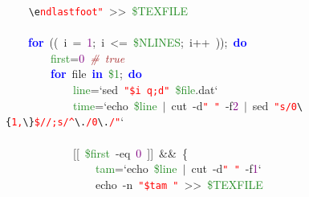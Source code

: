 \mbox{}\texttt{\textcolor{Red}{\ \ \ \ }}\texttt{\textcolor{CarnationPink}{\textbackslash{}e}}\texttt{\textcolor{Red}{ndlastfoot"{}}}\ \textcolor{BrickRed}{\textgreater{}\textgreater{}}\ \textcolor{ForestGreen}{\$TEXFILE} \\
\mbox{} \\
\mbox{}\ \ \ \ \textbf{\textcolor{Blue}{for}}\ \textcolor{BrickRed}{((}\ i\ \textcolor{BrickRed}{=}\ \textcolor{Purple}{1}\textcolor{BrickRed}{;}\ i\ \textcolor{BrickRed}{\textless{}=}\ \textcolor{ForestGreen}{\$NLINES}\textcolor{BrickRed}{;}\ i\textcolor{BrickRed}{++}\ \textcolor{BrickRed}{));}\ \textbf{\textcolor{Blue}{do}} \\
\mbox{}\ \ \ \ \ \ \ \ \textcolor{ForestGreen}{first}\textcolor{BrickRed}{=}\textcolor{Purple}{0}\ \textit{\textcolor{Brown}{\#\ true}} \\
\mbox{}\ \ \ \ \ \ \ \ \textbf{\textcolor{Blue}{for}}\ file\ \textbf{\textcolor{Blue}{in}}\ \textcolor{ForestGreen}{\$1}\textcolor{BrickRed}{;}\ \textbf{\textcolor{Blue}{do}} \\
\mbox{}\ \ \ \ \ \ \ \ \ \ \ \ \textcolor{ForestGreen}{line}\textcolor{BrickRed}{=}`sed\ \texttt{\textcolor{Red}{"{}\$i\ q;d"{}}}\ \textcolor{ForestGreen}{\$file}\textcolor{BrickRed}{.}dat` \\
\mbox{}\ \ \ \ \ \ \ \ \ \ \ \ \textcolor{ForestGreen}{time}\textcolor{BrickRed}{=}`echo\ \textcolor{ForestGreen}{\$line}\ \textcolor{BrickRed}{$|$}\ cut\ -d\texttt{\textcolor{Red}{"{}\ "{}}}\ -f\textcolor{Purple}{2}\ \textcolor{BrickRed}{$|$}\ sed\ \texttt{\textcolor{Red}{"{}s/0}}\texttt{\textcolor{CarnationPink}{\textbackslash{}\{}}\texttt{\textcolor{Red}{1,}}\texttt{\textcolor{CarnationPink}{\textbackslash{}\}}}\texttt{\textcolor{Red}{\$//;s/\textasciicircum{}}}\texttt{\textcolor{CarnationPink}{\textbackslash{}.}}\texttt{\textcolor{Red}{/0}}\texttt{\textcolor{CarnationPink}{\textbackslash{}.}}\texttt{\textcolor{Red}{/"{}}}` \\
\mbox{}\ \ \ \ \ \ \ \ \ \ \ \  \\
\mbox{}\ \ \ \ \ \ \ \ \ \ \ \ \textcolor{BrickRed}{[[}\ \textcolor{ForestGreen}{\$first}\ -eq\ \textcolor{Purple}{0}\ \textcolor{BrickRed}{]]}\ \textcolor{BrickRed}{\&\&}\ \{ \\
\mbox{}\ \ \ \ \ \ \ \ \ \ \ \ \ \ \ \ \textcolor{ForestGreen}{tam}\textcolor{BrickRed}{=}`echo\ \textcolor{ForestGreen}{\$line}\ \textcolor{BrickRed}{$|$}\ cut\ -d\texttt{\textcolor{Red}{"{}\ "{}}}\ -f\textcolor{Purple}{1}` \\
\mbox{}\ \ \ \ \ \ \ \ \ \ \ \ \ \ \ \ echo\ -n\ \texttt{\textcolor{Red}{"{}\$tam\ "{}}}\ \textcolor{BrickRed}{\textgreater{}\textgreater{}}\ \textcolor{ForestGreen}{\$TEXFILE} \\
